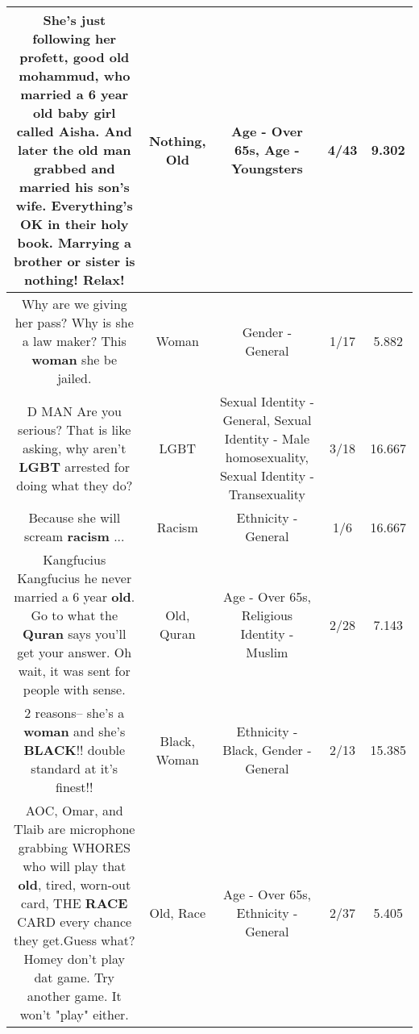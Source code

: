 \documentclass[11pt]{article}
\newlength\mylength
\begin{document}
\begin{center}
\begin{longtable}{|C{.65\mylength}|C{.30\mylength}|C{.12\mylength}|C{.12\mylength}|C{.12\mylength}|}
  \small She's just following her profett, good \textbf{old} mohammud, who married a 6 year \textbf{old} baby girl called Aisha. And later the \textbf{old} man grabbed and married his son's wife. Everything's OK in their holy book. Marrying a brother or sister is \textbf{nothing}! Relax!\normalsize   & Nothing, Old & Age - Over 65s, Age - Youngsters & 4/43 & 9.302 \\  \hline
  \small Why are we giving her pass? Why is she a law maker? This \textbf{woman} she be jailed.\normalsize   & Woman & Gender - General & 1/17 & 5.882 \\  \hline
  \small D MAN Are you serious? That is like asking, why aren't \textbf{L\textbf{G\textbf{BT}}} arrested for doing what they do?\normalsize   & LGBT & Sexual Identity - General, Sexual Identity - Male homosexuality, Sexual Identity - Transexuality & 3/18 & 16.667 \\  \hline
  \small Because she will scream \textbf{racism} ...\normalsize   & Racism & Ethnicity - General & 1/6 & 16.667 \\  \hline
  \small Kangfucius Kangfucius he never married a 6 year \textbf{old}. Go to what the \textbf{Quran} says you'll get your answer. Oh wait, it was sent for people with sense.\normalsize   & Old, Quran & Age - Over 65s, Religious Identity - Muslim & 2/28 & 7.143 \\  \hline
  \small 2 reasons-- she's a \textbf{woman} and she's \textbf{BLACK}!!  double standard at it's finest!!\normalsize   & Black, Woman & Ethnicity - Black, Gender - General & 2/13 & 15.385 \\  \hline
  \small AOC, Omar, and Tlaib are microphone grabbing WHORES who will play that \textbf{old}, tired, worn-out card, THE \textbf{RACE} CARD every chance they get.Guess what?  Homey don't play dat game. Try another game. It won't "play" either.\normalsize   & Old, Race & Age - Over 65s, Ethnicity - General & 2/37 & 5.405 \\  \hline

\end{longtable}
\end{center}
\end{document}
